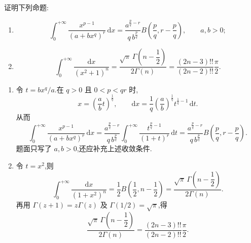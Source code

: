 \begin{example}
    证明下列命题:
    \begin{enumerate}
        \item
              \[
                  \int_0^{+\infty}\dfrac{x^{p-1}}{(a+bx^q)^r}\,\mathrm{d}x
                  =\dfrac{a^{\frac{p}{q}-r}}{q\,b^{\frac{p}{q}}}
                  B\left(\dfrac{p}{q},r-\dfrac{p}{q}\right),\qquad a,b>0;
              \]
        \item
              \[
                  \int_0^{+\infty}\dfrac{\mathrm{d}x}{(x^2+1)^n}
                  =\dfrac{\sqrt{\pi}\,\Gamma\left(n-\dfrac{1}{2}\right)}{2\Gamma(n)}
                  =\dfrac{(2n-3)!!}{(2n-2)!!}\dfrac{\pi}{2}.
              \]
    \end{enumerate}
\end{example}
\exampleblank

\begin{solution}
    \begin{enumerate}
        \item 令 $t=bx^q/a$.在 $q>0$ 且 $0<p<qr$ 时,
              \[
                  x=\left(\dfrac{a}{b}t\right)^{\frac{1}{q}},
                  \qquad
                  \mathrm{d}x=\dfrac{1}{q}\left(\dfrac{a}{b}\right)^{\frac{1}{q}}
                  t^{\frac{1}{q}-1}\,\mathrm{d}t.
              \]
              从而
              \[
                  \int_0^{+\infty}\dfrac{x^{p-1}}{(a+bx^q)^r}\,\mathrm{d}x
                  =\dfrac{a^{\frac{p}{q}-r}}{q\,b^{\frac{p}{q}}}
                  \int_0^{+\infty}\dfrac{t^{\frac{p}{q}-1}}{(1+t)^r}\,\mathrm{d}t
                  =\dfrac{a^{\frac{p}{q}-r}}{q\,b^{\frac{p}{q}}}
                  B\left(\dfrac{p}{q},r-\dfrac{p}{q}\right).
              \]
              题面只写了 $a,b>0$,还应补充上述收敛条件.
        \item 令 $t=x^2$,则
              \[
                  \int_0^{+\infty}\dfrac{\mathrm{d}x}{(1+x^2)^n}
                  =\dfrac{1}{2}B\left(\dfrac{1}{2},n-\dfrac{1}{2}\right)
                  =\dfrac{\sqrt\pi\,\Gamma\left(n-\dfrac{1}{2}\right)}{2\Gamma(n)}.
              \]
              再用 $\Gamma(z+1)=z\Gamma(z)$ 及 $\Gamma(1/2)=\sqrt\pi$,得
              \[
                  \dfrac{\sqrt\pi\,\Gamma\left(n-\dfrac{1}{2}\right)}{2\Gamma(n)}
                  =\dfrac{(2n-3)!!}{(2n-2)!!}\dfrac{\pi}{2}.
              \]
    \end{enumerate}
\end{solution}


